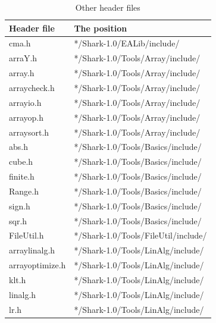\documentclass[twocolumn]{article}
\begin{document}
\newpage

\begin{table}[h]
\begin{center}
\caption{Other header files}
\label{AppA}
{\scriptsize
\begin{tabular}{|l|l|}\hline
Header file                &  The position                            \\\hline\hline
cma.h                      & */Shark-1.0/EALib/include/               \\\hline
arraY.h                    & */Shark-1.0/Tools/Array/include/         \\\hline
array.h                    & */Shark-1.0/Tools/Array/include/         \\\hline
arraycheck.h               & */Shark-1.0/Tools/Array/include/         \\\hline
arrayio.h                  & */Shark-1.0/Tools/Array/include/         \\\hline
arrayop.h                  & */Shark-1.0/Tools/Array/include/         \\\hline
arraysort.h                & */Shark-1.0/Tools/Array/include/         \\\hline
abs.h                      & */Shark-1.0/Tools/Basics/include/        \\\hline
cube.h                     & */Shark-1.0/Tools/Basics/include/        \\\hline
finite.h                   & */Shark-1.0/Tools/Basics/include/        \\\hline
Range.h                    & */Shark-1.0/Tools/Basics/include/        \\\hline
sign.h                     & */Shark-1.0/Tools/Basics/include/        \\\hline
sqr.h                      & */Shark-1.0/Tools/Basics/include/        \\\hline
FileUtil.h                 & */Shark-1.0/Tools/FileUtil/include/      \\\hline
arraylinalg.h              & */Shark-1.0/Tools/LinAlg/include/        \\\hline
arrayoptimize.h            & */Shark-1.0/Tools/LinAlg/include/        \\\hline
klt.h                      & */Shark-1.0/Tools/LinAlg/include/        \\\hline
linalg.h                   & */Shark-1.0/Tools/LinAlg/include/        \\\hline
lr.h                       & */Shark-1.0/Tools/LinAlg/include/        \\\hline

\end{tabular}}
\end{center}
\end{table}
\end{document}
